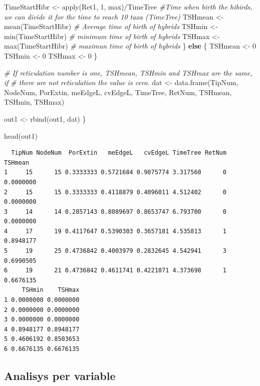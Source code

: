 \documentclass[
]{article}
\newenvironment{Shaded}{\begin{snugshade}}{\end{snugshade}}
\newcommand{\CommentTok}[1]{\textcolor[rgb]{0.56,0.35,0.01}{\textit{#1}}}
\newcommand{\ControlFlowTok}[1]{\textcolor[rgb]{0.13,0.29,0.53}{\textbf{#1}}}
\newcommand{\DecValTok}[1]{\textcolor[rgb]{0.00,0.00,0.81}{#1}}
\newcommand{\FunctionTok}[1]{\textcolor[rgb]{0.00,0.00,0.00}{#1}}
\newcommand{\NormalTok}[1]{#1}
\newcommand{\OtherTok}[1]{\textcolor[rgb]{0.56,0.35,0.01}{#1}}
\newcommand{\SpecialCharTok}[1]{\textcolor[rgb]{0.00,0.00,0.00}{#1}}
\begin{document}
\begin{Shaded}
\begin{Highlighting}[]
\NormalTok{        TimeStartHibr }\OtherTok{\textless{}{-}} \FunctionTok{apply}\NormalTok{(Ret1, }\DecValTok{1}\NormalTok{, max)}\SpecialCharTok{/}\NormalTok{TimeTree  }\CommentTok{\#Time when birth the hibirds, we can divide it for the time to reach 10 taxa (TimeTree)}
\NormalTok{        TSHmean }\OtherTok{\textless{}{-}} \FunctionTok{mean}\NormalTok{(TimeStartHibr)  }\CommentTok{\# Average time of birth of hybrids }
\NormalTok{        TSHmin }\OtherTok{\textless{}{-}} \FunctionTok{min}\NormalTok{(TimeStartHibr)  }\CommentTok{\# minimum time of birth of hybrids }
\NormalTok{        TSHmax }\OtherTok{\textless{}{-}} \FunctionTok{max}\NormalTok{(TimeStartHibr)  }\CommentTok{\# maximun time of birth of hybrids }
\NormalTok{    \} }\ControlFlowTok{else}\NormalTok{ \{}
\NormalTok{        TSHmean }\OtherTok{\textless{}{-}} \DecValTok{0}
\NormalTok{        TSHmin }\OtherTok{\textless{}{-}} \DecValTok{0}
\NormalTok{        TSHmax }\OtherTok{\textless{}{-}} \DecValTok{0}
\NormalTok{    \}}

    \CommentTok{\# If reticulation number is one, TSHmean, TSHmin and TSHmax are the same, if}
    \CommentTok{\# there are not reticulation the value is cero.}
\NormalTok{    dat }\OtherTok{\textless{}{-}} \FunctionTok{data.frame}\NormalTok{(TipNum, NodeNum, PorExtin, meEdgeL, cvEdgeL, TimeTree, RetNum, }
\NormalTok{        TSHmean, TSHmin, TSHmax)}

\NormalTok{    out1 }\OtherTok{\textless{}{-}} \FunctionTok{rbind}\NormalTok{(out1, dat)}
\NormalTok{\}}

\FunctionTok{head}\NormalTok{(out1)}
\end{Highlighting}
\end{Shaded}

\begin{verbatim}
  TipNum NodeNum  PorExtin   meEdgeL   cvEdgeL TimeTree RetNum   TSHmean
1     15      15 0.3333333 0.5721684 0.9075774 3.317560      0 0.0000000
2     15      15 0.3333333 0.4118879 0.4096011 4.512402      0 0.0000000
3     14      14 0.2857143 0.8089697 0.8653747 6.793700      0 0.0000000
4     17      19 0.4117647 0.5390303 0.3657181 4.535813      1 0.8948177
5     19      25 0.4736842 0.4003979 0.2832645 4.542941      3 0.6990505
6     19      21 0.4736842 0.4611741 0.4221071 4.373698      1 0.6676135
     TSHmin    TSHmax
1 0.0000000 0.0000000
2 0.0000000 0.0000000
3 0.0000000 0.0000000
4 0.8948177 0.8948177
5 0.4606192 0.8503653
6 0.6676135 0.6676135
\end{verbatim}

\hypertarget{analisys-per-variable}{%
\subsection{Analisys per variable}\label{analisys-per-variable}}
\end{document}
